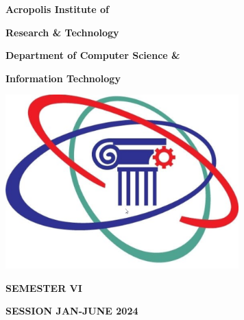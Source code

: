 \documentclass[12pt,,a4paper]{article}
\begin{document}
\thispagestyle{empty}
\vspace*{-3cm}

\begin{center}
\textbf{\fontsize{22}{\baselineskip}\selectfont Acropolis Institute of }

\bigskip

\textbf{\fontsize{22}{\baselineskip}\selectfont Research \& Technology}

\bigskip

\textbf{\fontsize{14}{\baselineskip}\selectfont Department of Computer Science \& }

\bigskip

\textbf{\fontsize{14}{\baselineskip}\selectfont Information Technology }

\bigskip


\bigskip

\includegraphics[width=9cm]{logo-3.png}
\vspace*{1cm}
\bigskip

\textbf{\fontsize{20}{\baselineskip}\selectfont SEMESTER VI}

\bigskip

\textbf{\fontsize{20}{\baselineskip}\selectfont SESSION JAN-JUNE 2024}

\bigskip

\bigskip

\bigskip


\bigskip


\end{center}

\bigskip


\bigskip

\end{document}
